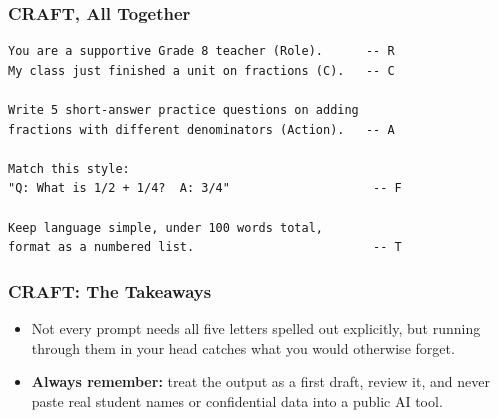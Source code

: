\begin{frame}[fragile]\frametitle{CRAFT, All Together}

\begin{lstlisting}[language=HTML]
You are a supportive Grade 8 teacher (Role).      -- R
My class just finished a unit on fractions (C).   -- C

Write 5 short-answer practice questions on adding
fractions with different denominators (Action).   -- A

Match this style:
"Q: What is 1/2 + 1/4?  A: 3/4"                    -- F

Keep language simple, under 100 words total,
format as a numbered list.                         -- T
\end{lstlisting}

\end{frame}

\begin{frame}[fragile]\frametitle{CRAFT: The Takeaways}

\begin{itemize}
    \item Not every prompt needs all five letters spelled out explicitly, but running through them in your head catches what you would otherwise forget.
    \item \textbf{Always remember:} treat the output as a first draft, review it, and never paste real student names or confidential data into a public AI tool.
\end{itemize}

\end{frame}
